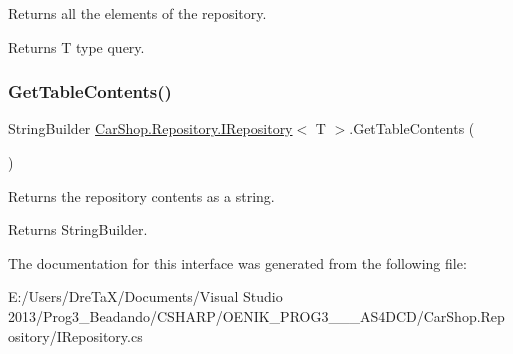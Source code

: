 Returns all the elements of the repository. 

\begin{DoxyReturn}{Returns}
T type query.
\end{DoxyReturn}
\mbox{\label{interface_car_shop_1_1_repository_1_1_i_repository_a36fd2e239dc17c35fe1c732efdeb131b}} 
\subsubsection{\texorpdfstring{Get\+Table\+Contents()}{GetTableContents()}}
{\footnotesize\ttfamily String\+Builder \mbox{\hyperlink{interface_car_shop_1_1_repository_1_1_i_repository}{Car\+Shop.\+Repository.\+I\+Repository}}$<$ T $>$.Get\+Table\+Contents (\begin{DoxyParamCaption}{ }\end{DoxyParamCaption})}



Returns the repository contents as a string. 

\begin{DoxyReturn}{Returns}
String\+Builder.
\end{DoxyReturn}


The documentation for this interface was generated from the following file\+:\begin{DoxyCompactItemize}
\item 
E\+:/\+Users/\+Dre\+Ta\+X/\+Documents/\+Visual Studio 2013/\+Prog3\+\_\+\+Beadando/\+C\+S\+H\+A\+R\+P/\+O\+E\+N\+I\+K\+\_\+\+P\+R\+O\+G3\+\_\+\_\+\_\+\+A\+S4\+D\+C\+D/\+Car\+Shop.\+Repository/I\+Repository.\+cs\end{DoxyCompactItemize}
